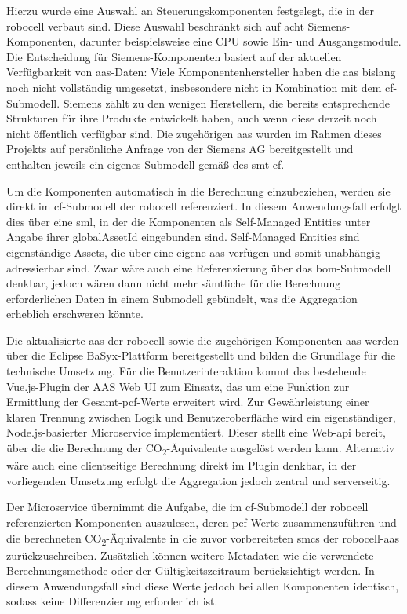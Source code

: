 Hierzu wurde eine Auswahl an Steuerungskomponenten festgelegt, die in der robocell verbaut sind. 
Diese Auswahl beschränkt sich auf acht Siemens-Komponenten, darunter beispielsweise eine CPU sowie Ein- und Ausgangsmodule. 
Die Entscheidung für Siemens-Komponenten basiert auf der aktuellen Verfügbarkeit von \acs{aas}-Daten: Viele Komponentenhersteller haben die \acs{aas} bislang noch nicht vollständig umgesetzt, insbesondere nicht in Kombination mit dem \acs{cf}-Submodell. 
Siemens zählt zu den wenigen Herstellern, die bereits entsprechende Strukturen für ihre Produkte entwickelt haben, auch wenn diese derzeit noch nicht öffentlich verfügbar sind. 
Die zugehörigen \acs{aas} wurden im Rahmen dieses Projekts auf persönliche Anfrage von der Siemens AG bereitgestellt und enthalten jeweils ein eigenes Submodell gemäß des \acs{smt} \acs{cf}.

Um die Komponenten automatisch in die Berechnung einzubeziehen, werden sie direkt im \acs{cf}-Submodell der robocell referenziert. 
In diesem Anwendungsfall erfolgt dies über eine \acs{sml}, in der die Komponenten als Self-Managed Entities unter Angabe ihrer globalAssetId eingebunden sind. 
Self-Managed Entities sind eigenständige Assets, die über eine eigene \acs{aas} verfügen und somit unabhängig adressierbar sind. 
Zwar wäre auch eine Referenzierung über das \acs{bom}-Submodell denkbar, jedoch wären dann nicht mehr sämtliche für die Berechnung erforderlichen Daten in einem Submodell gebündelt, was die Aggregation erheblich erschweren könnte.

Die aktualisierte \acs{aas} der robocell sowie die zugehörigen Komponenten-\acs{aas} werden über die Eclipse BaSyx-Plattform bereitgestellt und bilden die Grundlage für die technische Umsetzung. 
Für die Benutzerinteraktion kommt das bestehende Vue.js-Plugin der AAS Web UI zum Einsatz, das um eine Funktion zur Ermittlung der Gesamt-\acs{pcf}-Werte erweitert wird. 
Zur Gewährleistung einer klaren Trennung zwischen Logik und Benutzeroberfläche wird ein eigenständiger, Node.js-basierter Microservice implementiert. 
Dieser stellt eine Web-\acs{api} bereit, über die die Berechnung der CO\textsubscript{2}-Äquivalente ausgelöst werden kann. 
Alternativ wäre auch eine clientseitige Berechnung direkt im Plugin denkbar, in der vorliegenden Umsetzung erfolgt die Aggregation jedoch zentral und serverseitig.

Der Microservice übernimmt die Aufgabe, die im \acs{cf}-Submodell der robocell referenzierten Komponenten auszulesen, deren \acs{pcf}-Werte zusammenzuführen und die berechneten CO\textsubscript{2}-Äquivalente in die zuvor vorbereiteten \acsp{smc} der robocell-\acs{aas} zurückzuschreiben. 
Zusätzlich können weitere Metadaten wie die verwendete Berechnungsmethode oder der Gültigkeitszeitraum berücksichtigt werden. 
In diesem Anwendungsfall sind diese Werte jedoch bei allen Komponenten identisch, sodass keine Differenzierung erforderlich ist.

